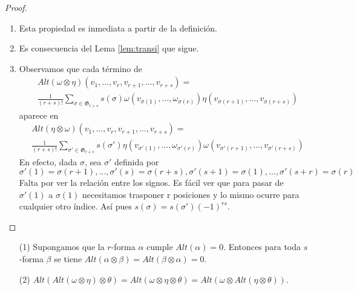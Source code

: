 \documentclass[../VD.tex]{subfiles}
\begin{document}
\begin{proof}
\begin{enumerate}
\item Esta propiedad es inmediata a partir de la definición.
\item Es consecuencia del Lema \ref{lem:transi} que sigue.
\item Observamos que cada término de
\begin{align*}
&Alt(\omega\otimes\eta)(v_1,\ldots,v_r,v_{r+1},\ldots,v_{r+s})=\\
&\frac{1}{(r+s)!}\sum_{\sigma\in \mathfrak{G}_{r+s}}s(\sigma)\omega(v_{\sigma(1)},\ldots,\omega_{\sigma(r)})\eta(v_{\sigma(r+1)},\ldots,v_{\sigma(r+s)})
\end{align*}
aparece en
\begin{align*}
&Alt(\eta\otimes\omega)(v_1,\ldots,v_r,v_{r+1},\ldots,v_{r+s})=\\
&\frac{1}{(r+s)!}\sum_{\sigma'\in \mathfrak{G}_{r+s}}s(\sigma')\eta(v_{\sigma'(1)},\ldots,\omega_{\sigma'(r)})\omega(v_{\sigma'(r+1)},\ldots,v_{\sigma'(r+s)})
\end{align*}
En efecto, dada \( \sigma \), sea \( \sigma' \) definida por
\(
\sigma'(1)=\sigma(r+1),\ldots,\sigma'(s)=\sigma(r+s),\sigma'(s+1)=\sigma(1),\ldots,\sigma'(s+r)=\sigma(r)
\)
Falta por ver la relación entre los signos. Es fácil ver que para pasar de \( \sigma'(1) \) a \( \sigma(1) \) necesitamos trasponer r posiciones y lo mismo ocurre para cualquier otro índice. Así pues \( s(\sigma)= s(\sigma')(-1)^{rs} \).
\end{enumerate}
\end{proof}

\begin{lemma}\label{lem:transi}
	\begin{enumerate}
\item [(1)] Supongamos que la \(r\)-forma \( \alpha \) cumple \( Alt(\alpha)=0 \). Entonces para toda \(s\)-forma \( \beta \) se tiene \( Alt(\alpha\otimes\beta)=Alt(\beta\otimes\alpha)=0 \).
\item [(2)] \( Alt(Alt(\omega\otimes\eta)\otimes\theta)=Alt(\omega\otimes\eta\otimes\theta)=Alt(\omega\otimes Alt(\eta\otimes \theta)) \).
\end{enumerate}
\end{lemma}
\end{document}

